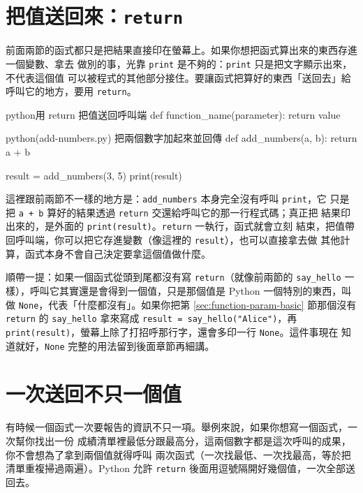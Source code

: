 \section{把值送回來：\texttt{return}}
\label{sec:function-return}

前面兩節的函式都只是把結果直接印在螢幕上。如果你想把函式算出來的東西存進一個變數、拿去
做別的事，光靠 \texttt{print} 是不夠的：\texttt{print} 只是把文字顯示出來，不代表這個值
可以被程式的其他部分接住。要讓函式把算好的東西「送回去」給呼叫它的地方，要用
\texttt{return}。

\begin{code}{python}{用 return 把值送回呼叫端}
def function_name(parameter):
    return value
\end{code}

\begin{example}{python}{(add-numbers.py) 把兩個數字加起來並回傳}
def add_numbers(a, b):
    return a + b


result = add_numbers(3, 5)
print(result)
\end{example}


這裡跟前兩節不一樣的地方是：\texttt{add\_numbers} 本身完全沒有呼叫 \texttt{print}，它
只是把 \texttt{a + b} 算好的結果透過 \texttt{return} 交還給呼叫它的那一行程式碼；真正把
結果印出來的，是外面的 \texttt{print(result)}。\texttt{return} 一執行，函式就會立刻
結束，把值帶回呼叫端，你可以把它存進變數（像這裡的 \texttt{result}），也可以直接拿去做
其他計算，函式本身不會自己決定要拿這個值做什麼。

順帶一提：如果一個函式從頭到尾都沒有寫 \texttt{return}（就像前兩節的 \texttt{say\_hello}
一樣），呼叫它其實還是會得到一個值，只是那個值是 Python 一個特別的東西，叫做
\texttt{None}，代表「什麼都沒有」。如果你把第 \ref{sec:function-param-basic} 節那個沒有 \texttt{return} 的
\texttt{say\_hello} 拿來寫成 \texttt{result = say\_hello("Alice")}，再
\texttt{print(result)}，螢幕上除了打招呼那行字，還會多印一行 \texttt{None}。這件事現在
知道就好，\texttt{None} 完整的用法留到後面章節再細講。

\section{一次送回不只一個值}
\label{sec:function-multi-return}

有時候一個函式一次要報告的資訊不只一項。舉例來說，如果你想寫一個函式，一次幫你找出一份
成績清單裡最低分跟最高分，這兩個數字都是這次呼叫的成果，你不會想為了拿到兩個值就得呼叫
兩次函式（一次找最低、一次找最高，等於把清單重複掃過兩遍）。Python 允許
\texttt{return} 後面用逗號隔開好幾個值，一次全部送回去。

